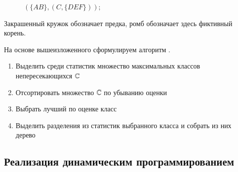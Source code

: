 \begin{example}
\begin{figure}[H]
      \caption{$(\{AB\}, (C, \{DEF\}));$}
    \endminipage
  \end{figure}
  Закрашенный кружок обозначает предка, ромб обозначает здесь фиктивный корень.
\end{example}


На основе вышеизложенного сформулируем алгоритм .
\begin{enumerate}
  \item Выделить среди статистик множество максимальных классов непересекающихся $\mathbb{C}$
  \item Отсортировать множество $\mathbb{C}$ по убыванию оценки
  \item Выбрать лучший по оценке класс
  \item Выделить разделения из статистик выбранного класса и собрать из них дерево
\end{enumerate}

\subsection{Реализация динамическим программированием}

